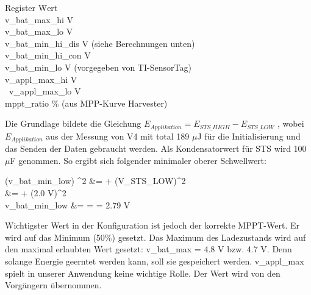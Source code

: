 \begin{minipage}{\textwidth}
    \begin{tabbing}
    Register\hspace{4cm} \quad\= Wert \\[0.8ex]
    v\_bat\_max\_hi        V \\
    v\_bat\_max\_lo        V \\
    v\_bat\_min\_hi\_dis   V (siehe Berechnungen unten)\\
    v\_bat\_min\_hi\_con   V \\
    v\_bat\_min\_lo        V (vorgegeben von TI-SensorTag)\\
    v\_appl\_max\_hi       V \\\
    v\_appl\_max\_lo       V \\ 
    mppt\_ratio            \thinspace\% (aus MPP-Kurve Harvester)\\
    \end{tabbing}
\end{minipage}

Die Grundlage bildete die Gleichung  $E_{Applikation}= E_{STS\_HIGH} - E_{STS\_LOW}$ , wobei  $E_{Applikation}$ aus der Messung von V4 mit total 189 $\mu$J für die Initialisierung und das Senden der Daten gebraucht werden. Als Kondensatorwert für STS wird 100 $\mu$F genommen. So ergibt sich folgender minimaler oberer Schwellwert:

\begin{flalign}\label{eq:bat_min_low_schwellwert}
    (v\_bat\_min\_low) ^2  &=   + (V_{STS\_LOW})^2\\
     &=  \frac{2\, \times \, 189, \mu J}{100 \,\mu F} + (2.0 V)^2\\ \nonumber
    v\_bat\_min\_low  &=  \sqrt{\frac{378 \,\mu J}{100 \,\mu F} + 4 V^2} =  = 2.79 V \\\nonumber
\end{flalign}

Wichtigster Wert in der Konfiguration ist jedoch der korrekte MPPT-Wert. Er wird auf das Minimum (50\thinspace\%) gesetzt. Das Maximum des Ladezustands  wird auf den maximal erlaubten Wert gesetzt: v\_bat\_max  = 4.8 V bzw. 4.7 V. Denn solange Energie geerntet werden kann, soll sie gespeichert werden. v\_appl\_max spielt in unserer Anwendung keine wichtige Rolle. Der Wert wird von den Vorgängern übernommen.

